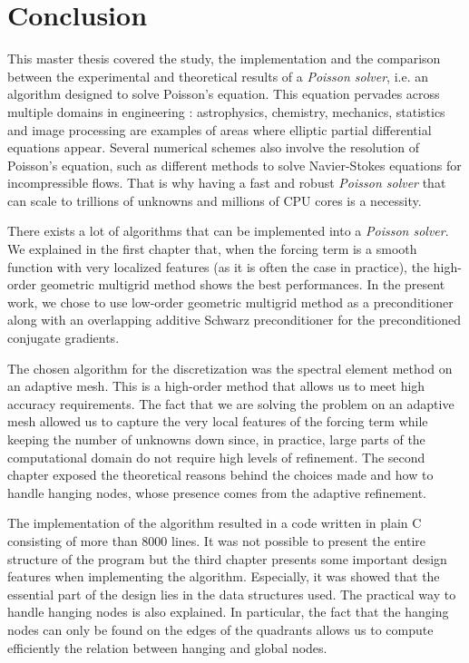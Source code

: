 \chapter*{Conclusion}

This master thesis covered the study, the implementation and the comparison between the experimental and theoretical results of a \textit{Poisson solver}, i.e. an algorithm designed to solve Poisson's equation. This equation pervades across multiple domains in engineering : astrophysics, chemistry, mechanics, statistics and image processing are examples of areas where elliptic partial differential equations appear. Several numerical schemes also involve the resolution of Poisson's equation, such as different methods to solve Navier-Stokes equations for incompressible flows. That is why having a fast and robust \textit{Poisson solver} that can scale to trillions of unknowns and millions of CPU cores is a necessity. 

There exists a lot of algorithms that can be implemented into a \textit{Poisson solver}. We explained in the first chapter that, when the forcing term is a smooth function with very localized features (as it is often the case in practice), the high-order geometric multigrid method shows the best performances. In the present work, we chose to use low-order geometric multigrid method as a preconditioner along with an overlapping additive Schwarz preconditioner for the preconditioned conjugate gradients.  

The chosen algorithm for the discretization was the spectral element method on an adaptive mesh. This is a high-order method that allows us to meet high accuracy requirements. The fact that we are solving the problem on an adaptive mesh allowed us to capture the very local features of the forcing term while keeping the number of unknowns down since, in practice, large parts of the computational domain do not require high levels of refinement. The second chapter exposed the theoretical reasons behind the choices made and how to handle hanging nodes, whose presence comes from the adaptive refinement. 

The implementation of the algorithm resulted in a code written in plain C consisting of more than 8000 lines. It was not possible to present the entire structure of the program but the third chapter presents some important design features when implementing the algorithm. Especially, it was showed that the essential part of the design lies in the data structures used. The practical way to handle hanging nodes is also explained. In particular, the fact that the hanging nodes can only be found on the edges of the quadrants allows us to compute efficiently the relation between hanging and global nodes. 

